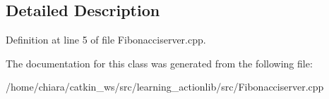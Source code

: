 \subsection{Detailed Description}


Definition at line 5 of file Fibonacciserver.\+cpp.



The documentation for this class was generated from the following file\+:\begin{DoxyCompactItemize}
\item 
/home/chiara/catkin\+\_\+ws/src/learning\+\_\+actionlib/src/Fibonacciserver.\+cpp\end{DoxyCompactItemize}
